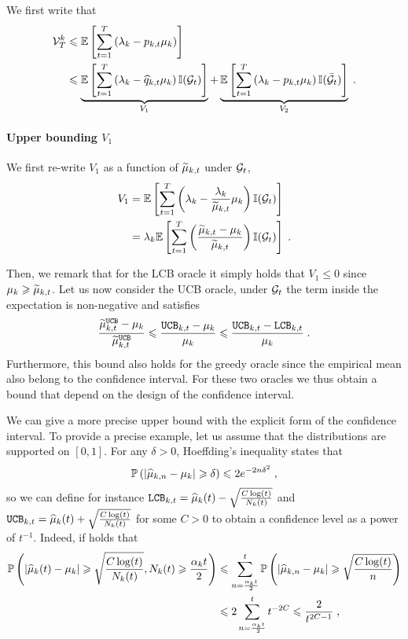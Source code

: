 We first write that 
\begin{align*}
\mathcal{V}_T^k &\leqslant \mathbb{E}\left[\sum_{t=1}^T \left(\lambda_k-p_{k, t} \mu_k \right)\right] \\
&
\leqslant  \underbrace{\mathbb{E}\left[\sum_{t=1}^T \left(\lambda_k-\widehat{q}_{k,t} \mu_k \right) \mathbb{I}(\mathcal{G}_t)\right]}_{V_1} + \underbrace{\mathbb{E}\left[\sum_{t=1}^T \left(\lambda_k-p_{k, t} \mu_k \right) \mathbb{I}(\bar {\mathcal{G}}_t)\right]}_{V_2} \;. \\
\end{align*}

\paragraph{Upper bounding $V_1$} We first re-write $V_1$ as a function of $\widetilde{\mu}_{k, t}$ under $\mathcal{G}_t$, 
\begin{align*}
V_1 & = \mathbb{E}\left[\sum_{t=1}^T \left(\lambda_k- \frac{\lambda_k}{\widetilde{\mu}_{k, t}} \mu_k \right) \mathbb{I}(\mathcal{G}_t)\right] \\
& = \lambda_k \mathbb{E}\left[\sum_{t=1}^T \left(\frac{\widetilde{\mu}_{k,t}-\mu_k}{\widetilde{\mu}_{k,t}}\right) \mathbb{I}(\mathcal{G}_t)\right]\;.
\end{align*}

Then, we remark that for the LCB oracle it simply holds that $V_1\leq 0$ since $\mu_k\geqslant \widetilde{\mu}_{k,t}$. Let us now consider the UCB oracle, under $\mathcal{G}_t$ the term inside the expectation is non-negative and satisfies 
\[\frac{\widetilde{\mu}_{k,t}^{\texttt{UCB}}-\mu_k}{\widetilde{\mu}_{k,t}^{\texttt{UCB}}} \leqslant \frac{\texttt{UCB}_{k,t}-\mu_k}{\mu_k} \leqslant \frac{\texttt{UCB}_{k,t}-\texttt{LCB}_{k, t}}{\mu_k} \;. \]
Furthermore, this bound also holds for the greedy oracle since the empirical mean also belong to the confidence interval. For these two oracles we thus obtain a bound that depend on the design of the confidence interval. 

We can give a more precise upper bound with the explicit form of the confidence interval. To provide a precise example, let us assume that the distributions are supported on $[0,1]$. For any $\delta>0$, Hoeffding's inequality states that 
\[\mathbb{P}\left(|\widehat{\mu}_{k, n}-\mu_k|\geqslant \delta \right)\leqslant 2e^{-2n\delta^2}\;, \]
so we can define for instance $\texttt{LCB}_{k,t} = \widehat{\mu}_k(t) - \sqrt{\frac{C\log(t)}{N_k(t)}} $ and $\texttt{UCB}_{k,t} = \widehat{\mu}_k(t) + \sqrt{\frac{C\log(t)}{N_k(t)}}$ for some $C>0$ to obtain a confidence level as a power of $t^{-1}$. Indeed, if holds that 
\begin{align*} \mathbb{P}\left(|\widehat{\mu}_k(t)- \mu_k|\geqslant \sqrt{\frac{C\log(t)}{N_k(t)}}, N_k(t)\geqslant \frac{\alpha_k t}{2} \right)&\leqslant \sum_{n=\frac{\alpha_k t}{2}}^t \mathbb{P}\left(|\widehat{\mu}_{k, n}- \mu_k|\geqslant \sqrt{\frac{C\log(t)}{n}}\right)  \\
&\leqslant 2 \sum_{n=\frac{\alpha_k t}{2}}^t t^{-2C}\leqslant \frac{2}{t^{2C-1}} \;,
\end{align*}

